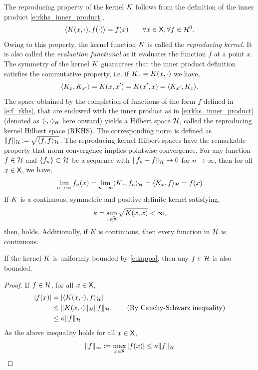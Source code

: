 The reproducing property of the kernel $K$ follows from the definition of the inner product \eqref{e:rkhs_inner_product},
\begin{equation}
\langle \Kern(x,\cdot), f(\cdot)\rangle = f(x) \qquad \forall x \in \state, \forall f \in \clH^0.
\label{e:rkhs_rep_property}
\end{equation}
Owing to this property, the kernel function $K$ is called the \textit{reproducing kernel}. It is also called the \textit{evaluation functional} as it evaluates the function $f$ at a point $x$. The symmetry of the kernel $K$ guarantees that the inner product definition satisfies the commutative property, i.e. if $K_x = K(x, \cdot)$ we have,
\begin{equation}
\langle K_x, K_{x'} \rangle =  K(x,x') = K(x',x) =  \langle K_{x'}, K_x \rangle. 
\end{equation}
The space obtained by the completion of functions of the form $f$ defined in \eqref{e:f_rkhs}, that are endowed with the inner product as in \eqref{e:rkhs_inner_product} (denoted as $\langle \cdot, \cdot \rangle_{{\cal H}}$ here onward) yields a Hilbert space ${\cal H}$, called the reproducing kernel Hilbert space (RKHS). The corresponding norm is defined as $\|f\|_{\cal H} \mathbin{:=} \sqrt{\langle f, f \rangle_{\cal H}}$. The reproducing kernel Hilbert spaces have the remarkable property that norm convergence implies pointwise convergence. 
For any function $f\in{\cal H}$ and $\{f_n\}\subset {\cal H}$ be a sequence with $\|f_n - f\|_{\cal H} \to 0$ for $n \to \infty$, then for all $x \in {\sf X}$, we have,
\begin{equation}
\lim_{n\to\infty} f_n(x) = \lim_{n \to \infty} \langle K_x,  f_n \rangle_{\cal H} = \langle K_x, f \rangle_{\cal H} = f(x)
\end{equation}
If $K$ is a continuous, symmetric and positive definite kernel satisfying, 
\begin{equation}
\kappa = \sup_{x \in \state} \sqrt{\Kern(x,x)} < \infty,
\label{e:kappa}
\end{equation}
then,  holds. Additionally, if $K$ is continuous, then every function in ${\cal H}$ is continuous. 
\begin{proposition}
\label{prop:RKHS_bounded}
	If the kernel $K$ is uniformly bounded by \eqref{e:kappa}, then any $f \in {\cal H}$ is also bounded. 
\end{proposition}
\begin{proof}
	If $f \in {\cal H}$, for all $x \in {\sf X}$,
	\begin{equation}
	\begin{aligned}
	|f(x)| &= |\langle K(x,\cdot), f \rangle_{\cal H}| \\
	& \leq \|K(x,\cdot)\|_{\cal H} \|f\|_{\cal H}, \qquad{\text{(By Cauchy-Schwarz inequality)}}\\ 
	& \leq \kappa \|f\|_{\cal H}
	\end{aligned}
	\end{equation}
	As the above inequality holds for all $x \in {\sf X}$, 
	\begin{equation}
	\|f\|_\infty := \max_{x\in {\sf X}}|f(x)| \leq \kappa \|f\|_{\cal H}
	\end{equation}
\end{proof}

